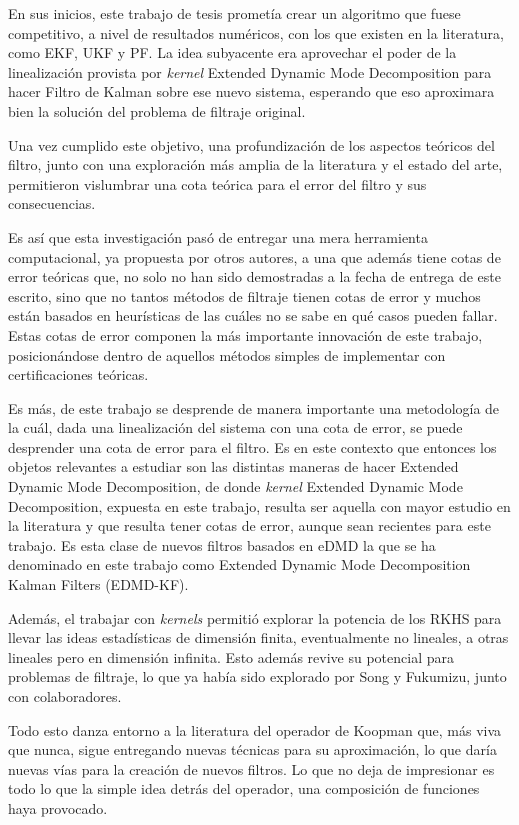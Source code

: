 En sus inicios, este trabajo de tesis prometía crear un algoritmo que fuese competitivo, a nivel de resultados numéricos, con los que existen en la literatura, como EKF, UKF y PF. La idea subyacente era aprovechar el poder de la linealización provista por \textit{kernel} Extended Dynamic Mode Decomposition para hacer Filtro de Kalman sobre ese nuevo sistema, esperando que eso aproximara bien la solución del problema de filtraje original.

Una vez cumplido este objetivo, una profundización de los aspectos teóricos del filtro, junto con una exploración más amplia de la literatura y el estado del arte, permitieron vislumbrar una cota teórica para el error del filtro y sus consecuencias.

Es así que esta investigación pasó de entregar una mera herramienta computacional, ya propuesta por otros autores, a una que además tiene cotas de error teóricas que, no solo no han sido demostradas a la fecha de entrega de este escrito, sino que no tantos métodos de filtraje tienen cotas de error y muchos están basados en heurísticas de las cuáles no se sabe en qué casos pueden fallar. Estas cotas de error componen la más importante innovación de este trabajo, posicionándose dentro de aquellos métodos simples de implementar con certificaciones teóricas.

Es más, de este trabajo se desprende de manera importante una metodología de la cuál, dada una linealización del sistema con una cota de error, se puede desprender una cota de error para el filtro. Es en este contexto que entonces los objetos relevantes a estudiar son las distintas maneras de hacer Extended Dynamic Mode Decomposition, de donde \textit{kernel} Extended Dynamic Mode Decomposition, expuesta en este trabajo, resulta ser aquella con mayor estudio en la literatura y que resulta tener cotas de error, aunque sean recientes para este trabajo. Es esta clase de nuevos filtros basados en eDMD la que se ha denominado en este trabajo como Extended Dynamic Mode Decomposition Kalman Filters (EDMD-KF).

Además, el trabajar con \textit{kernels} permitió explorar la potencia de los RKHS para llevar las ideas estadísticas de dimensión finita, eventualmente no lineales, a otras lineales pero en dimensión infinita. Esto además revive su potencial para problemas de filtraje, lo que ya había sido explorado por Song y Fukumizu, junto con colaboradores.

Todo esto danza entorno a la literatura del operador de Koopman que, más viva que nunca, sigue entregando nuevas técnicas para su aproximación, lo que daría nuevas vías para la creación de nuevos filtros. Lo que no deja de impresionar es todo lo que la simple idea detrás del operador, una composición de funciones haya provocado.

